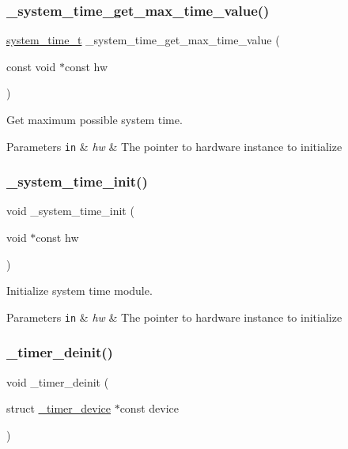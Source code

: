 \subsubsection{\texorpdfstring{\+\_\+system\+\_\+time\+\_\+get\+\_\+max\+\_\+time\+\_\+value()}{\_system\_time\_get\_max\_time\_value()}}
{\footnotesize\ttfamily \hyperlink{group___h_p_l_ga5885ba48297c95f5c8a108cfa02e6e55}{system\+\_\+time\+\_\+t} \+\_\+system\+\_\+time\+\_\+get\+\_\+max\+\_\+time\+\_\+value (\begin{DoxyParamCaption}\item[{const void $\ast$const}]{hw }\end{DoxyParamCaption})}



Get maximum possible system time. 


\begin{DoxyParams}[1]{Parameters}
\mbox{\tt in}  & {\em hw} & The pointer to hardware instance to initialize \\
\hline
\end{DoxyParams}
\mbox{\label{group___h_p_l_gafa42a76bae0892be69f99fad9ad2f312}} 
\subsubsection{\texorpdfstring{\+\_\+system\+\_\+time\+\_\+init()}{\_system\_time\_init()}}
{\footnotesize\ttfamily void \+\_\+system\+\_\+time\+\_\+init (\begin{DoxyParamCaption}\item[{void $\ast$const}]{hw }\end{DoxyParamCaption})}



Initialize system time module. 


\begin{DoxyParams}[1]{Parameters}
\mbox{\tt in}  & {\em hw} & The pointer to hardware instance to initialize \\
\hline
\end{DoxyParams}
\mbox{\label{group___h_p_l_gac9b7787b4e39ba73070712a897e3198e}} 
\subsubsection{\texorpdfstring{\+\_\+timer\+\_\+deinit()}{\_timer\_deinit()}}
{\footnotesize\ttfamily void \+\_\+timer\+\_\+deinit (\begin{DoxyParamCaption}\item[{struct \hyperlink{struct__timer__device}{\+\_\+timer\+\_\+device} $\ast$const}]{device }\end{DoxyParamCaption})}




